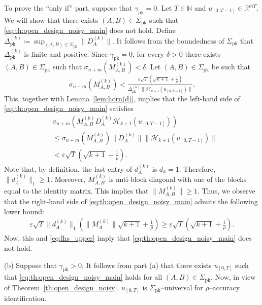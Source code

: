 \documentclass[journal,twoside,web]{ieeecolor}
\begin{document}
To prove the ``only if'' part, suppose that $\gamma_\text{pk}=0$. Let $T\in\mathbb{N}$ and $u_{[0,T-1]}\in\mathbb{R}^{mT}$. We will show that there exists \mbox{$(A,B)\in\Sigma_\text{pk}$} such that \eqref{eq:th:open_design_noisy_main} does not hold. Define \mbox{$\Delta_\text{pk}^{(k)}\coloneqq \sup_{(A,B)\in\Sigma_\text{pk}}\|D_A^{(k)}\|$}. It follows from the boundedness of $\Sigma_\text{pk}$ that $\Delta_\text{pk}^{(k)}$ is finite and positive. Since \mbox{$\gamma_\text{pk}=0$}, for every $\delta>0$ there exists $(A,B)\in\Sigma_\text{pk}$ such that $\sigma_{n+m}(M_{A,B}^{(k)})<\delta$. Let $(A,B)\in\Sigma_\text{pk}$ be such that
\begin{equation}
\label{eq:small_cont}
\sigma_{n+m}(M_{A,B}^{(k)})<\tfrac{\varepsilon\sqrt{T}(\sqrt{k+1}+\frac{1}{\rho})}{\Delta_\text{pk}^{\!(k)}\|\mathcal{H}_{k+1}(u_{[0,T-1]})\|}.
\end{equation}
This, together with Lemma~\ref{lem:horn(d)}, implies that the left-hand side of \eqref{eq:th:open_design_noisy_main} satisfies
\begin{equation}
\begin{split}
&\sigma_{n+m}(M^{(k)}_{A,B}D_{\!A}^{(k)}\mathcal{H}_{k+1}(u_{[0,T-1]}))\\
&\leq\sigma_{n+m}(M^{(k)}_{A,B})\|D_{\!A}^{(k)}\|\|\mathcal{H}_{k+1}(u_{[0,T-1]})\| \\
\label{eq:lhs_upper}
&< \varepsilon\sqrt{T}(\sqrt{k+1}+\tfrac{1}{\rho}).
\end{split}
\end{equation}
Note that, by definition, the last entry of $d_A^{(k)}$ is \mbox{$d_k=1$}. Therefore, $\|d_A^{(k)}\|_1\geq 1$. Moreover, $M^{(k)}_{A,B}$ is anti-block diagonal with one of the blocks equal to the identity matrix. This implies that $\|M^{(k)}_{A,B}\|\geq 1$. Thus, we observe that the right-hand side of \eqref{eq:th:open_design_noisy_main} admits the following lower bound:
\begin{equation}
\label{eq:rhs_lower}
\begin{split}
\varepsilon\sqrt{T}\|d_A^{(k)}\|_1(\|M_{A}^{(k)}\|\sqrt{k+1}+\tfrac{1}{\rho})
\geq \varepsilon\sqrt{T}(\sqrt{k+1}+\tfrac{1}{\rho}).
\end{split}
\end{equation}
Now, this and \eqref{eq:lhs_upper} imply that \eqref{eq:th:open_design_noisy_main} does not hold. 

(b) Suppose that $\gamma_\text{pk}>0$. It follows from part (a) that there exists $u_{[0,T]}$ such that \eqref{eq:th:open_design_noisy_main} holds for all $(A,B)\in\Sigma_\text{pk}$. Now, in view of Theorem~\ref{th:open_design_noisy}, $u_{[0,T]}$ is $\Sigma_\text{pk}$--universal for $\rho$--accuracy identification. \hfill \QED
\end{document}
